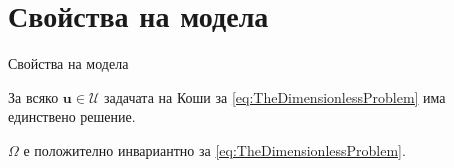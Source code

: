\section{\hspace{1em}Свойства на модела}


\begin{frame}[t]{Свойства на модела}
  \begin{proposition}
    За всяко $\boldsymbol{u} \in \mathscr{U}$ задачата на Коши за \eqref{eq:TheDimensionlessProblem} има единствено решение.
  \end{proposition}


  \begin{proposition}
    $\Omega$ е положително инвариантно за \eqref{eq:TheDimensionlessProblem}.
  \end{proposition}

\end{frame}

